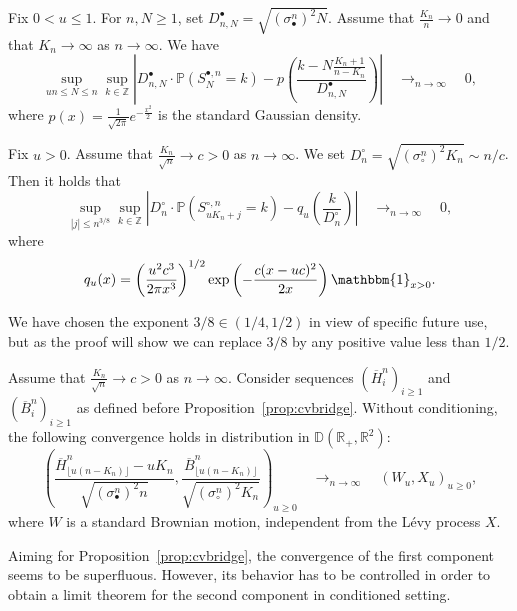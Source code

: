 \documentclass[10pt]{amsart}
\theoremstyle{definition}\newtheorem{defi}[theo]{Definition}\newtheorem{rema}[theo]{Remark}\newtheorem{exam}[theo]{Example}\newtheorem{exem}[theo]{Example}\newtheorem{nota}[theo]{Notation}
\newcommand{\Z}{\mathbb{Z}}
\newcommand{\R}{\mathbb{R}}
\def\scn{\sigma_{\circ}^{n}}
\def\sbn{\sigma_{\bullet}^{n}}
\def\Sbn{S^{\bullet,n}}
\def\Scn{S^{\circ,n}}
\def\DbnN{D^{\bullet}_{n,N}}
\def\Dcn{D^{\circ}_{n}}
\def\oB{\overline{B}}
\def\oH{\overline{H}}
\renewcommand\Pr[1]{\mathbb{P}\left(#1\right)}
\begin{document}
\begin{lemma} \label{lem:ll1}
  Fix $0<u \leq 1$. For $n,N \geq 1$,  set  $\DbnN= \sqrt{ (\sbn)^{2}  N}$. Assume that $ \tfrac{K_{n}}{n} \rightarrow 0$ and that $K_{n} \rightarrow \infty$ as $n \rightarrow \infty$.
  We have
  \[  \sup_{un \leq N  \leq n} \sup_{k \in \Z  } \left|  \DbnN  \cdot \Pr{\Sbn_N=k}
  -   p \left( \frac{k- N\tfrac{K_n+1}{n-K_n}}
  {  \DbnN  }\right)\right|  \quad \mathop{\longrightarrow}_{n \rightarrow \infty} \quad 0,\]
  where $p(x)= \frac{1}{\sqrt{2 \pi}} e^{- \frac{x^{2}}{2}}$ is the standard Gaussian density.
  \label{lem:ll1Uniforme}
\end{lemma}



\begin{lemma}\label{lem:ll2}
 Fix $u>0$. Assume that $ \tfrac{K_{n}}{\sqrt{n}} \rightarrow c>0$ as $n \rightarrow \infty$.  We set $\Dcn=\sqrt{ (\scn)^{2} K_{n} } \sim n /c$.
 Then it holds that
\[ \sup_{|j| \leq n^{3/8}} \sup_{k \in \Z} \left|  \Dcn \cdot \Pr{\Scn_{ uK_{n}  + j }=k} -  q_{u} \left( \frac{k}{  \Dcn }\right)\right|  \quad \mathop{\longrightarrow}_{n \rightarrow \infty} \quad 0,\]
where
\begin{equation}
\label{eq:defqu}q_{u}(x)=\left( \frac{u^{2} c^{3}}{2 \pi x^{3}} \right)^{1/2} \exp \left(  - \frac{c (x-uc)^{2} }{2x} \right) \mathbbm{1}_{x>0}.
\end{equation}\end{lemma}


We have chosen the exponent $3/8 \in (1/4,1/2)$ in view of specific future use,  but as the proof will show we can replace $3/8$ by  any positive value less than $1/2$.


   \begin{lemma}\label{lem:cvnoncond}
  Assume that $ \tfrac{K_{n}}{\sqrt{n}} \rightarrow c>0$ as $n \rightarrow \infty$.
  Consider sequences $(\oH^{n}_i)_{i \ge 1}$ and $(\oB^{n}_i)_{i \ge 1}$ as defined before Proposition~\ref{prop:cvbridge}.
  Without conditioning, the following convergence holds in distribution in $\mathbb{D}(\R_{+},\R^{2})$:
  \[ \left(  \frac{\oH^{n}_{ \lfloor u (n-K_{n}) \rfloor } - u K_{n} }{\sqrt{ (\sbn)^{2} n} },  \frac{\oB^{n}_{ \lfloor u (n-K_{n}) \rfloor }}{\sqrt{ (\scn)^{2} K_{n}}} \right)_{u \geq 0}  \quad \mathop{\longrightarrow}_{n \rightarrow \infty} \quad  (W_{u},X_{u})_{u \geq 0},\]
 where $W$ is a standard Brownian motion, independent from the L\'evy process $X$.
  \end{lemma}

 Aiming for Proposition~\ref{prop:cvbridge}, the convergence of the first component seems to be superfluous.
 However,  its behavior has to be controlled in order to obtain a limit theorem for the second component
 in conditioned setting.
\end{document}
